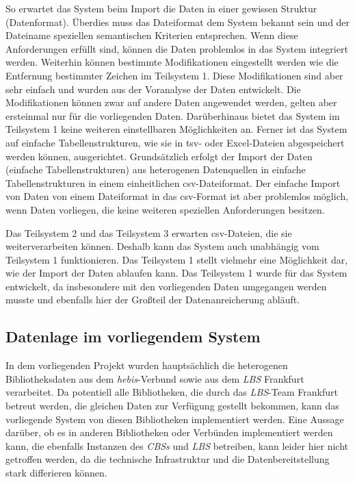 So erwartet das System beim Import die Daten in einer gewissen Struktur (Datenformat). 
Überdies muss das Dateiformat dem System bekannt sein und der Dateiname speziellen semantischen 
Kriterien entsprechen. Wenn diese Anforderungen erfüllt sind, können die Daten problemlos in das System integriert werden.
Weiterhin können bestimmte Modifikationen eingestellt werden wie die Entfernung
bestimmter Zeichen im Teilsystem 1. Diese Modifikationen sind aber sehr einfach und wurden aus der Voranalyse
der Daten entwickelt. Die Modifikationen können zwar auf andere Daten angewendet werden, gelten aber ersteinmal nur für die vorliegenden Daten. 
Darüberhinaus bietet das System im Teilsystem 1 keine weiteren einstellbaren Möglichkeiten an. Ferner ist das System auf einfache 
Tabellenstrukturen, wie sie in tsv- oder Excel-Dateien abgespeichert werden können, ausgerichtet.
Grundsätzlich erfolgt der Import der Daten (einfache Tabellenstrukturen) aus heterogenen Datenquellen 
in einfache Tabellenstrukturen in einem einheitlichen csv-Dateiformat. Der einfache Import von Daten von einem Dateiformat 
in das csv-Format ist aber problemlos möglich, wenn Daten vorliegen, die keine weiteren speziellen
Anforderungen besitzen.

Das Teilsystem 2 und das Teilsystem 3 erwarten csv-Dateien, die sie weiterverarbeiten können. 
Deshalb kann das System auch unabhängig vom Teilsystem 1 funktionieren. 
Das Teilsystem 1 stellt vielmehr eine Möglichkeit dar, wie der Import der Daten ablaufen kann. 
Das Teilsystem 1 wurde für das System entwickelt, da insbesondere mit den vorliegenden Daten umgegangen werden musste und ebenfalls hier 
der Großteil der Datenanreicherung abläuft.


\subsection{Datenlage im vorliegendem System}
In dem vorliegenden Projekt wurden hauptsächlich die heterogenen Bibliotheksdaten aus dem \textit{\acrshort{hebis}}-Verbund sowie aus dem \textit{\acrlong{LBS}} Frankfurt verarbeitet.
Da potentiell alle Bibliotheken, die durch das \textit{\acrshort{LBS}}-Team Frankfurt betreut werden, die gleichen Daten zur Verfügung gestellt bekommen,
kann das vorliegende  System von diesen Bibliotheken implementiert werden. Eine Aussage darüber, ob es in anderen Bibliotheken oder Verbünden implementiert werden kann, die ebenfalls
Instanzen des \textit{\acrlong{CBS}s} und \textit{\acrshort{LBS}} betreiben, kann leider hier nicht getroffen werden, da die technische Infrastruktur
und die Datenbereitstellung stark differieren können. 

